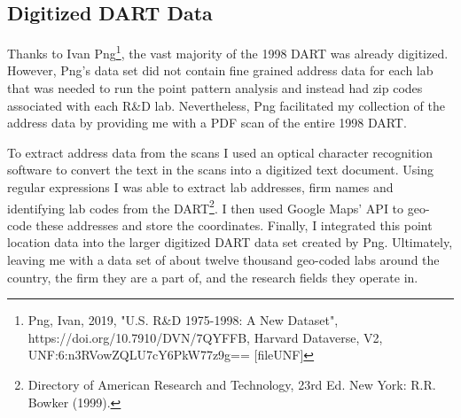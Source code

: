 \documentclass[12pt,letterpaper]{article}
\begin{document}
\subsection{Digitized DART Data}
Thanks to Ivan Png\footnote{Png, Ivan, 2019, "U.S. R&D 1975-1998: A New Dataset", https://doi.org/10.7910/DVN/7QYFFB, Harvard Dataverse, V2, UNF:6:n3RVowZQLU7cY6PkW77z9g== [fileUNF]}, the vast majority of the 1998 DART was already digitized. However, Png's data set did not contain fine grained address data for each lab that was needed to run the point pattern analysis and instead had zip codes associated with each R\&D lab. Nevertheless, Png facilitated my collection of the address data by providing me with a PDF scan of the entire 1998 DART. 
\par 
To extract address data from the scans I used an optical character recognition software to convert the text in the scans into a digitized text document. Using regular expressions I was able to extract lab addresses, firm names and identifying lab codes from the DART\footnote{Directory of American Research and Technology, 23rd Ed. New York: R.R. Bowker (1999).}. I then used Google Maps' API to geo-code these addresses and store the coordinates. Finally, I integrated this point location data into the larger digitized DART data set created by Png. Ultimately, leaving me with a data set of about twelve thousand geo-coded labs around the country, the firm they are a part of, and the research fields they operate in. 
\end{document}
